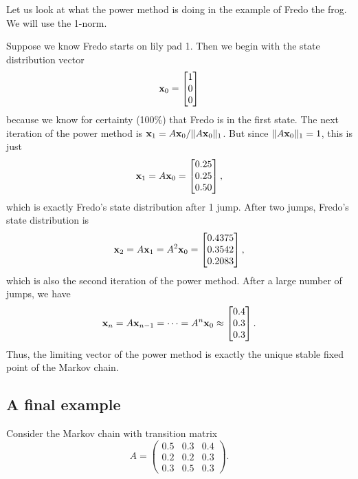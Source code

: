 Let us look at what the power method is doing in the example of Fredo the frog. 
We will use the 1-norm. 

Suppose we know Fredo starts on lily pad 1. Then we begin with the state distribution vector
\[
{\bf x}_0 = \begin{bmatrix}
1\\
0\\
0
\end{bmatrix}
\]
because we know for certainty (100\%) that Fredo is in the first state.
The next iteration of the power method is ${\bf x}_1=A{\bf x}_0/\|A{\bf x}_0\|_1$. But since $\|A{\bf x}_0\|_1=1$, this is just
\[
{\bf x}_1 = A {\bf x}_0 = \begin{bmatrix}
0.25\\
0.25\\
0.50
\end{bmatrix},
\]
which is exactly Fredo's state distribution after 1 jump.
After two jumps, Fredo's state distribution is
\[
{\bf x}_2 = A {\bf x}_1 = A^2 {\bf x}_0 = \begin{bmatrix}
0.4375\\
0.3542\\
0.2083
\end{bmatrix},
\]
which is also the second iteration of the power method.
After a large number of jumps, we have
\[
{\bf x}_n = A {\bf x}_{n-1} = \dots = A^n {\bf x}_0 \approx \begin{bmatrix}
0.4\\
0.3\\
0.3
\end{bmatrix}.
\]
Thus, the limiting vector of the power method is exactly the unique stable fixed point of the Markov chain. 

\subsection*{A final example}
Consider the Markov chain with transition matrix
\[
A = \begin{pmatrix}
0.5 & 0.3 & 0.4\\
0.2 & 0.2 & 0.3\\
0.3 & 0.5 & 0.3
\end{pmatrix}.
\]

